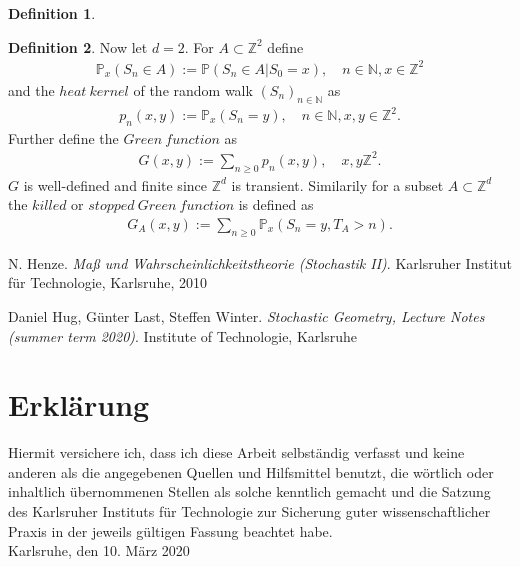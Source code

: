 \documentclass[12pt,a4paper]{scrartcl}
\numberwithin{equation}{subsection}
\newcommand{\Z}{\mathbb{Z}} %
\newcommand{\N}{\mathbb{N}} %
\newcommand{\1}{\mathbbm{1}}
\numberwithin{equation}{section}
\theoremstyle{definition}
\newtheorem{definition}{Definition}[subsection]
\begin{document}
\begin{definition}
	
\end{definition}




\begin{definition}
	Now let $d=2$. For $A\subset\Z^2$ define 
	\begin{align*}
		\mathbb{P}_x(S_n\in A) := \mathbb{P}(S_n\in A|S_0=x), \quad n\in\N,x\in\Z^2
	\end{align*}
	and the $heat\ kernel$ of the random walk $(S_n)_{n\in \N}$ as 
	\begin{align*}
		p_n(x,y):=\mathbb{P}_x(S_n=y), \quad n\in\N,x,y\in\Z^2. 
	\end{align*}
	Further define the $\mathit{Green\ function}$ as 
	\begin{align*}
		G(x,y) := \sum_{n\geq 0} p_n(x,y),\quad x,y\Z^2. 
	\end{align*}
	$G$ is well-defined and finite since $\Z^d$ is transient. Similarily for a subset $A\subset \Z^d$ the $killed$ or $\mathit{stopped\ Green\ function}$ is defined as
	\begin{align*}
		G_A(x,y) := \sum_{n\geq 0} \mathbb{P}_x(S_n=y, T_A > n).
	\end{align*} 
\end{definition}









\newpage

\begin{thebibliography}{biblio}
\thispagestyle{empty}

N. Henze.
\emph{Maß und Wahrscheinlichkeitstheorie (Stochastik II)}.
Karlsruher Institut für Technologie, Karlsruhe, 2010

Daniel Hug, Günter Last, Steffen Winter.
\emph{Stochastic Geometry, 	Lecture Notes (summer term 2020)}.
Institute of Technologie, Karlsruhe



\end{thebibliography}

\newpage
  
\thispagestyle{empty}

\vspace*{8cm}


\section*{Erklärung}

Hiermit versichere ich, dass ich diese Arbeit selbständig verfasst und keine anderen als die angegebenen Quellen und Hilfsmittel benutzt, die wörtlich oder inhaltlich übernommenen Stellen als solche kenntlich gemacht und die Satzung des Karlsruher Instituts für Technologie zur Sicherung guter wissenschaftlicher Praxis in der jeweils gültigen Fassung beachtet habe. \\[2ex] 

\noindent
Karlsruhe, den 10. März 2020\\[5ex] 
\end{document}
